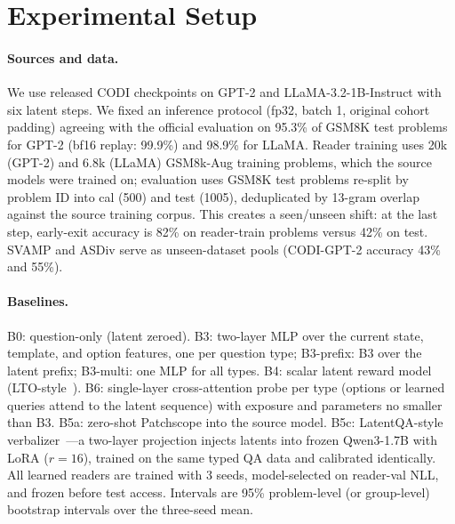 \section{Experimental Setup}
\label{sec:setup}

\paragraph{Sources and data.} We use released CODI checkpoints on GPT-2 and LLaMA-3.2-1B-Instruct with six latent steps. We fixed an inference protocol (fp32, batch 1, original cohort padding) agreeing with the official evaluation on 95.3\% of GSM8K test problems for GPT-2 (bf16 replay: 99.9\%) and 98.9\% for LLaMA. Reader training uses 20k (GPT-2) and 6.8k (LLaMA) GSM8k-Aug training problems, which the source models were trained on; evaluation uses GSM8K test problems re-split by problem ID into cal (500) and test (1005), deduplicated by 13-gram overlap against the source training corpus. This creates a seen/unseen shift: at the last step, early-exit accuracy is 82\% on reader-train problems versus 42\% on test. SVAMP and ASDiv serve as unseen-dataset pools (CODI-GPT-2 accuracy 43\% and 55\%).

\paragraph{Baselines.} B0: question-only (latent zeroed). B3: two-layer MLP over the current state, template, and option features, one per question type; B3-prefix: B3 over the latent prefix; B3-multi: one MLP for all types. B4: scalar latent reward model (LTO-style~\cite{lto}). B6: single-layer cross-attention probe per type (options or learned queries attend to the latent sequence) with exposure and parameters no smaller than B3. B5a: zero-shot Patchscope into the source model. B5c: LatentQA-style verbalizer~\cite{pan2024latentqa}---a two-layer projection injects latents into frozen Qwen3-1.7B with LoRA ($r{=}16$), trained on the same typed QA data and calibrated identically. All learned readers are trained with 3 seeds, model-selected on reader-val NLL, and frozen before test access. Intervals are 95\% problem-level (or group-level) bootstrap intervals over the three-seed mean.

